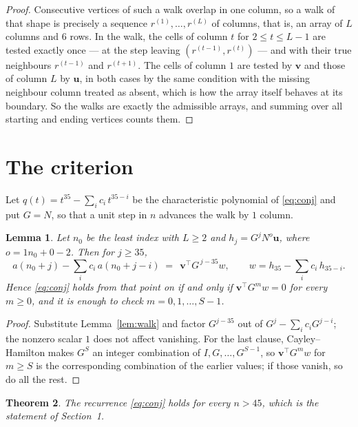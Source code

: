 \documentclass[11pt,a4paper]{article}
\theoremstyle{plain}
\newtheorem{theorem}{Theorem}
\newtheorem{lemma}[theorem]{Lemma}
\theoremstyle{definition}
\begin{document}
\begin{proof}
Consecutive vertices of such a walk overlap in one column, so a walk of that shape is
precisely a sequence $r^{(1)},\dots,r^{(L)}$ of columns, that is, an array of $L$ columns
and $6$ rows. In the walk, the cells of column $t$ for $2\le t\le L-1$ are tested
exactly once --- at the step leaving $(r^{(t-1)},r^{(t)})$ --- and with their true
neighbours $r^{(t-1)}$ and $r^{(t+1)}$. The cells of column $1$ are tested by
$\mathbf{v}$ and those of column $L$ by $\mathbf{u}$, in both cases by the same condition
with the missing neighbour column treated as absent, which is how the array itself behaves at
its boundary. So the walks are exactly the admissible arrays, and summing over all starting
and ending vertices counts them.
\end{proof}

\section{The criterion}

Let $q(t)=t^{35}-\sum_i c_i\,t^{35-i}$ be the characteristic polynomial of
\eqref{eq:conj} and put $G=N$, so that a unit step in $n$ advances the walk by
$1$ column.

\begin{lemma}\label{lem:crit}
Let $n_0$ be the least index with $L\ge2$ and $h_j=G^{j}N^{o}\mathbf{u}$, where
$o=1n_0+0-2$. Then for $j\ge35$,
\[
a(n_0+j)-\sum_i c_i\,a(n_0+j-i)\;=\;\,\mathbf{v}^{\!\top}G^{\,j-35}w,
\qquad w=h_{35}-\sum_i c_i\,h_{35-i} .
\]
Hence \eqref{eq:conj} holds from that point on if and only if
$\mathbf{v}^{\!\top}G^{m}w=0$ for every $m\ge0$, and it is enough to check
$m=0,1,\dots,S-1$.
\end{lemma}

\begin{proof}
Substitute Lemma~\ref{lem:walk} and factor $G^{j-35}$ out of
$G^{j}-\sum_ic_iG^{j-i}$; the nonzero scalar $1$ does not affect
vanishing. For the last clause, Cayley--Hamilton makes $G^{S}$ an integer combination of
$I,G,\dots,G^{S-1}$, so $\mathbf{v}^{\!\top}G^{m}w$ for $m\ge S$ is the corresponding
combination of the earlier values; if those vanish, so do all the rest.
\end{proof}

\begin{theorem}
The recurrence \eqref{eq:conj} holds for every $n>45$, which is the statement of
Section~1.
\end{theorem}
\end{document}
